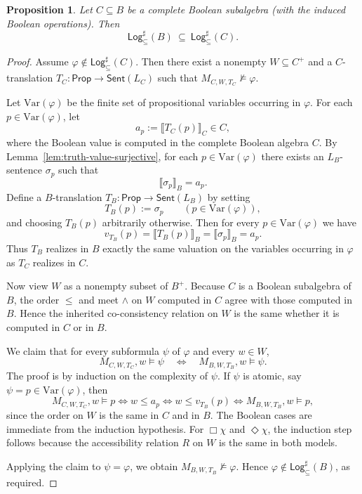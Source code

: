 \documentclass[11pt]{amsart}
\theoremstyle{definition}
\theoremstyle{plain}
\newtheorem{proposition}[definition]{Proposition}
\newcommand{\Prop}{\mathsf{Prop}}
\newcommand{\Sent}{\mathsf{Sent}}
\newcommand{\Logsub}{\mathsf{Log}_{\subseteq}^{\sharp}}
\begin{document}
\begin{proposition}\label{prop:complete-subalgebra-monotone}
Let $C\subseteq B$ be a complete Boolean subalgebra (with the induced Boolean operations).
Then
\[
\Logsub(B)\ \subseteq\ \Logsub(C).
\]
\end{proposition}

\begin{proof}
Assume $\varphi\notin \Logsub(C)$.
Then there exist a nonempty $W\subseteq C^+$ and a $C$-translation $T_C:\Prop\to\Sent(L_C)$ such that
$M_{C,W,T_C}\not\models \varphi$.

Let $\mathrm{Var}(\varphi)$ be the finite set of propositional variables occurring in $\varphi$. For each
$p\in \mathrm{Var}(\varphi)$, let
\[
a_p:=\llbracket T_C(p)\rrbracket_C\in C,
\]
where the Boolean value is computed in the complete Boolean algebra $C$. By Lemma~\ref{lem:truth-value-surjective},
for each $p\in \mathrm{Var}(\varphi)$ there exists an $L_B$-sentence $\sigma_p$ such that
\[
\llbracket \sigma_p\rrbracket_B=a_p.
\]
Define a $B$-translation $T_B:\Prop\to\Sent(L_B)$ by setting
\[
T_B(p):=\sigma_p \qquad (p\in \mathrm{Var}(\varphi)),
\]
and choosing $T_B(p)$ arbitrarily otherwise. Then for every $p\in \mathrm{Var}(\varphi)$ we have
\[
v_{T_B}(p)=\llbracket T_B(p)\rrbracket_B=\llbracket \sigma_p\rrbracket_B=a_p.
\]
Thus $T_B$ realizes in $B$ exactly the same valuation on the variables occurring in $\varphi$ as $T_C$ realizes in $C$.

Now view $W$ as a nonempty subset of $B^+$. Because $C$ is a Boolean subalgebra of $B$, the order $\le$
and meet $\wedge$ on $W$ computed in $C$ agree with those computed in $B$. Hence the inherited co-consistency relation on
$W$ is the same whether it is computed in $C$ or in $B$.

We claim that for every subformula $\psi$ of $\varphi$ and every $w\in W$,
\[
M_{C,W,T_C},w\models \psi \quad\Longleftrightarrow\quad M_{B,W,T_B},w\models \psi.
\]
The proof is by induction on the complexity of $\psi$. If $\psi$ is atomic, say $\psi=p\in \mathrm{Var}(\varphi)$, then
\[
M_{C,W,T_C},w\models p
\iff w\le a_p
\iff w\le v_{T_B}(p)
\iff M_{B,W,T_B},w\models p,
\]
since the order on $W$ is the same in $C$ and in $B$. The Boolean cases are immediate from the induction hypothesis. For
$\Box\chi$ and $\Diamond\chi$, the induction step follows because the accessibility relation $R$ on $W$ is the same in both
models.

Applying the claim to $\psi=\varphi$, we obtain $M_{B,W,T_B}\not\models \varphi$. Hence
$\varphi\notin \Logsub(B)$, as required.
\end{proof}
\end{document}
